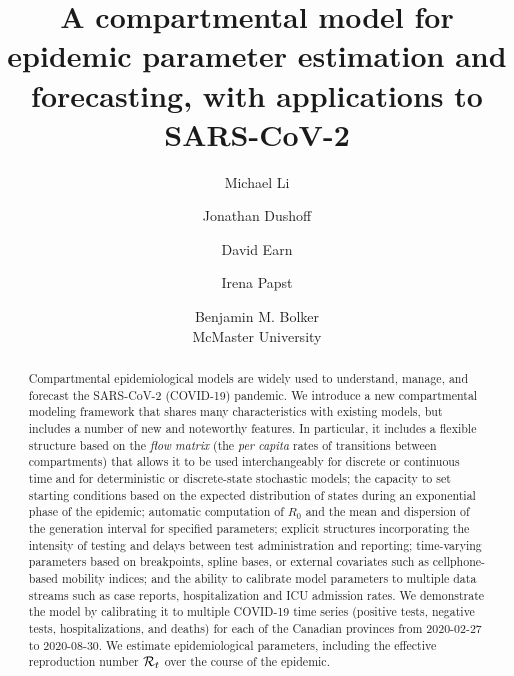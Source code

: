 \documentclass[12pt]{article}\usepackage[]{graphicx}\usepackage[]{color}
\title{A compartmental model for epidemic parameter estimation and forecasting, with applications to SARS-CoV-2}
\author{Michael Li \and Jonathan Dushoff \and David Earn \and Irena Papst \and Benjamin M. Bolker \\
  McMaster University\\
}
\begin{document}
\linenumbers
\maketitle

\begin{abstract}
Compartmental epidemiological models are widely used to understand, manage, and forecast the SARS-CoV-2 (COVID-19) pandemic. 
We introduce a new compartmental modeling framework that shares many characteristics with existing models, but includes a number of new and noteworthy features.
In particular, it includes a flexible structure based on the \emph{flow matrix} (the \emph{per capita} rates of transitions between compartments) that allows it to be used interchangeably for discrete or continuous time and for deterministic or discrete-state stochastic models; the capacity to set starting conditions based on the expected distribution of states during an exponential phase of the epidemic; automatic computation of $R_0$ and the mean and dispersion of the generation interval for specified parameters; explicit structures incorporating the intensity of testing and delays between test administration and reporting; time-varying parameters based on breakpoints, spline bases, or external covariates such as cellphone-based mobility indices; and the ability to calibrate model parameters to multiple data streams such as case reports, hospitalization and ICU admission rates.
We demonstrate the model by calibrating it to multiple COVID-19 time series (positive tests, negative tests, hospitalizations, and deaths) for each of the Canadian provinces from 2020-02-27 to 2020-08-30.  
We estimate epidemiological parameters, including the effective reproduction number ${\mathcal R}_t$ over the course of the epidemic.
\end{abstract}



\tableofcontents

\end{document}
